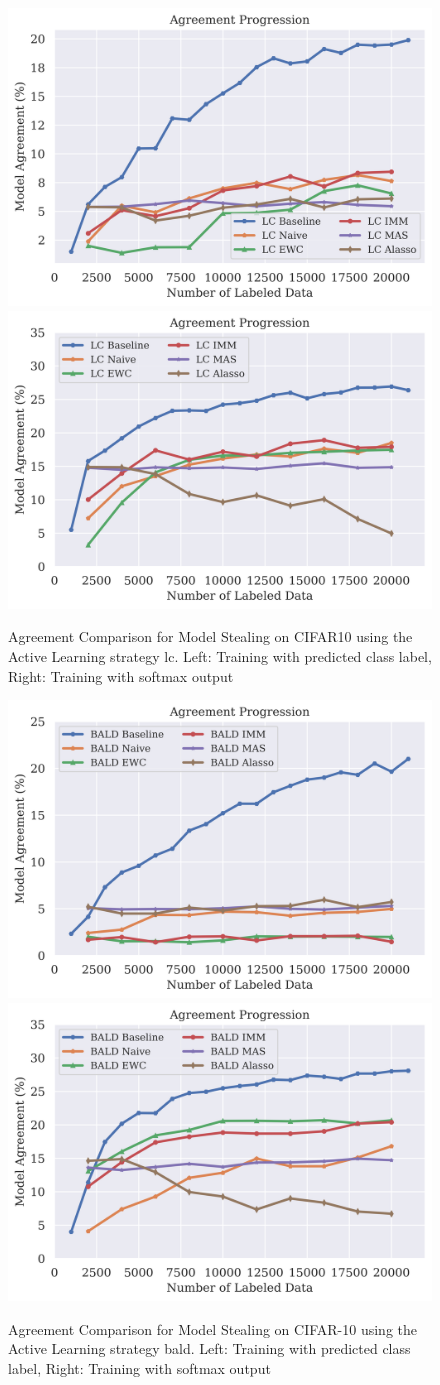 \begin{figure}[!htb]
    \centering
    \includegraphics[width=0.48\linewidth]{images/results_CALMS/cifar100_label_lc.png} \hfill
    \includegraphics[width=0.48\linewidth]{images/results_CALMS/cifar100_softmax_lc.png}
    \caption{Agreement Comparison for Model Stealing on CIFAR10 using the Active Learning strategy \gls{lc}. Left: Training with predicted class label,
    Right: Training with softmax output}
    \label{fig:CALMSCIFAR10LC}
\end{figure}

\begin{figure}[!htb]
    \centering
    \includegraphics[width=0.48\linewidth]{images/results_CALMS/cifar100_label_bald.png} \hfill
    \includegraphics[width=0.48\linewidth]{images/results_CALMS/cifar100_softmax_bald.png}
    \caption{Agreement Comparison for Model Stealing on CIFAR-10 using the Active Learning strategy \gls{bald}. Left: Training with predicted class label,
    Right: Training with softmax output}
    \label{fig:CALMSCIFAR10BALD}
\end{figure}

